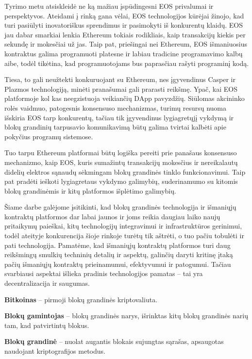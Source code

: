 \documentclass{VUMIFPSkursinis}
\begin{document}
Tyrimo metu atsiskleidė ne ką mažiau įspūdingesni EOS privalumai ir perspektyvos. Ateidami į rinką gana vėlai, EOS technologijos kūrėjai žinojo, kad turi pasiūlyti inovatoriškus sprendimus ir pasimokyti iš konkurentų klaidų. EOS jau dabar smarkiai lenkia Ethereum tokiais rodikliais, kaip transakcijų kiekis per sekundę ir mokesčiai už jas. Taip pat, priešingai nei Ethereum, EOS išmaniuosius kontraktus galima programuoti platesne ir labiau tradicine programavimo kalbų aibe, todėl tikėtina, kad programuotojams bus paprasčiau rašyti programinį kodą. 

Tiesa, to gali neužtekti konkuruojant su Ethereum, nes įgyvendinus Casper ir Plazmos technologiją, minėti pranašumai gali prarasti reikšmę. Ypač, kai EOS platformoje kol kas neegzistuoja veikiančių DApp pavyzdžių. Siūlomas akcininko rolės vaidmuo, patogesnis konsensuso mechanizmas, turimų resursų nuoma išskiria EOS tarp konkurentų, tačiau tik įgyvendinus lygiagretųjį vykdymą ir blokų grandinių tarpusavio komunikavimą būtų galima tvirtai kalbėti apie pokyčius programų sistemose.

Tuo tarpu Ethereum platformai būtų logiška pereiti prie panašaus konsensuso mechanizmo, kaip EOS, kuris sumažintų transakcijų mokesčius ir nereikalautų didelių elektros sąnaudų sėkmingam blokų grandinės tinklo funkcionavimui. Taip pat pradėti ieškoti lygiagretaus vykdymo galimybių, suderinamumo su kitomis blokų grandinėmis ir kitų platformos išplėtimo galimybių.

Šiame darbe galėjome įsitikinti, kad blokų grandinės technologija ir išmaniųjų kontraktų platformos dar labai jaunos ir joms reikia daugiau laiko naujų pritaikymų paieškai, kitų technologijų integravimui ir infrastruktūros gerinimui, todėl ateityje konkurencija šioje rinkoje turėtų tik aštrėti, o tuo pačiu tobulėti ir pati technologija. Pamatėme, kad išmaniųjų kontraktų platformos turi daug reikšmingų smulkių techninių detalių ir aspektų, galinčių daryti kritinę įtaką pačių išmaniųjų kontraktų prieinamumui, efektyvumui ir patogumui. Tačiau svarbiausi aspektai išlieka pradinis technologijos pamatas – tai yra decentralizacija ir saugumas.

\printbibliography[heading=bibintoc]

\textbf{Bitkoinas} – pirmoji blokų grandinės kriptovaliuta.

\textbf{Blokų gamintojas} – blokų grandinės narys, išrinktas kitų blokų grandinės narių tam, kad patvirtintų blokus.

\textbf{Blokų grandinė} – nuolat augantis blokais sujungtas sąrašas, apsaugotas naudojant kriptografijos metodus.
\end{document}
